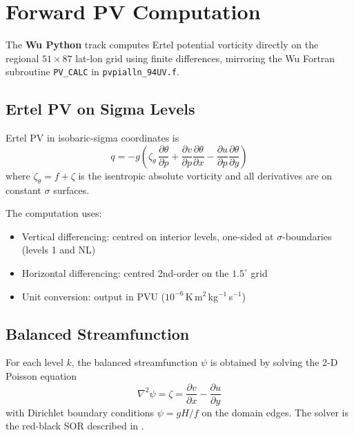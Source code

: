 \chapter{Forward PV Computation}
\label{chap:wupy_pv}

The \textbf{Wu Python} track computes Ertel potential vorticity directly
on the regional $51\times87$ lat-lon grid using finite differences,
mirroring the Wu Fortran subroutine \texttt{PV\_CALC} in
\texttt{pvpialln\_94UV.f}.

\section{Ertel PV on Sigma Levels}

Ertel PV in isobaric-sigma coordinates is
\begin{equation}
  q = -g\left(
    \zeta_\theta\,\frac{\partial\theta}{\partial p}
    + \frac{\partial v}{\partial p}\frac{\partial\theta}{\partial x}
    - \frac{\partial u}{\partial p}\frac{\partial\theta}{\partial y}
  \right)
  \label{eq:ertel_sigma}
\end{equation}
where $\zeta_\theta = f + \zeta$ is the isentropic absolute vorticity and
all derivatives are on constant $\sigma$ surfaces.

The computation uses:
\begin{itemize}
  \item Vertical differencing: centred on interior levels, one-sided at
        $\sigma$-boundaries (levels 1 and NL)
  \item Horizontal differencing: centred 2nd-order on the $1.5^\circ$ grid
  \item Unit conversion: output in PVU ($10^{-6}\,$K\,m$^2$\,kg$^{-1}$\,s$^{-1}$)
\end{itemize}

\section{Balanced Streamfunction}

For each level $k$, the balanced streamfunction $\psi$ is obtained by
solving the 2-D Poisson equation
\begin{equation}
  \nabla^2\psi = \zeta = \frac{\partial v}{\partial x} - \frac{\partial u}{\partial y}
  \label{eq:psi_poisson}
\end{equation}
with Dirichlet boundary conditions $\psi = gH/f$ on the domain edges.
The solver is the red-black SOR described in .

